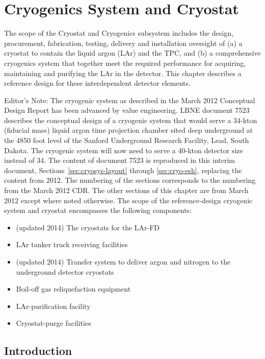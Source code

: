 \chapter{Cryogenics System and Cryostat}
\label{ch:cryosys}

The scope of the Cryostat and Cryogenics subsystem includes the design, procurement, fabrication, testing, delivery and installation oversight of (a) a cryostat to contain the
liquid argon (LAr) and the TPC, and (b) a comprehensive cryogenics system that together meet the required performance for acquiring, maintaining and purifying the
LAr in the detector.  This chapter describes a reference design for these interdependent detector elements.

\notestart
Editor's Note: The cryogenic system as described in the March
2012 Conceptual Design Report has been advanced by value engineering. 
LBNE document 7523 describes the conceptual design of a cryogenic system that would
serve a 34-kton (fiducial mass) liquid argon time projection chamber sited deep underground at
the 4850 foot level of the Sanford Underground Research Facility, Lead, South Dakota. The cryogenic system will now need to serve a 40-kton detector size instead of 34. The content of document 7523 is
reproduced in this interim document, Sections~\ref{sec:cryosys-layout} through \ref{sec:cryo-esh}, 
replacing the content from 2012. The numbering of the sections 
corresponds to the numbering from the March 2012 CDR. The other sections of this chapter are from March 2012 except where noted otherwise. 
\notestop
The scope of the reference-design cryogenic system and cryostat encompasses the following components:

\begin{itemize}
\item (updated 2014) The cryostats for the LAr-FD 
\item LAr tanker truck receiving facilities
\item (updated 2014) Transfer system to deliver argon and nitrogen to the underground detector cryostats
\item Boil-off gas reliquefaction equipment
\item LAr-purification facility
\item Cryostat-purge facilities
\end{itemize}

\section{Introduction}


